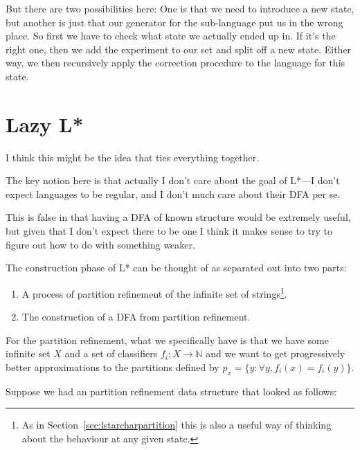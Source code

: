 \documentclass[a4paper]{book}
\begin{document}
But there are two possibilities here:
One is that we need to introduce a new state,
but another is just that our generator for the sub-language put us in the wrong place.
So first we have to check what state we actually ended up in.
If it's the right one,
then we add the experiment to our set and split off a new state.
Either way, we then recursively apply the correction procedure to the language for this state.

\section{Lazy L*}

I think this might be the idea that ties everything together.

The key notion here is that actually I don't care about the goal of L*---I
don't expect languages to be regular,
and I don't much care about their DFA per se.

This is false in that having a DFA of known structure would be extremely useful,
but given that I don't expect there to be one I think it makes sense to try to figure out how to do with something weaker.

The construction phase of L* can be thought of as separated out into two parts:

\begin{enumerate}
\item A process of partition refinement of the infinite set of strings\footnote{
As in Section~\ref{sec:lstarcharpartition} this is also a useful way of thinking about the behaviour at any given state.
}.
\item The construction of a DFA from partition refinement.
\end{enumerate}

For the partition refinement,
what we specifically have is that we have some infinite set \(X\) and a set of classifiers \(f_i: X \to \mathbb{N}\) and we want to get progressively better approximations to the partitions defined by \(p_x = \{y: \forall y, f_i(x) = f_i(y)\}\).

Suppose we had an partition refinement data structure that looked as follows:
\end{document}
